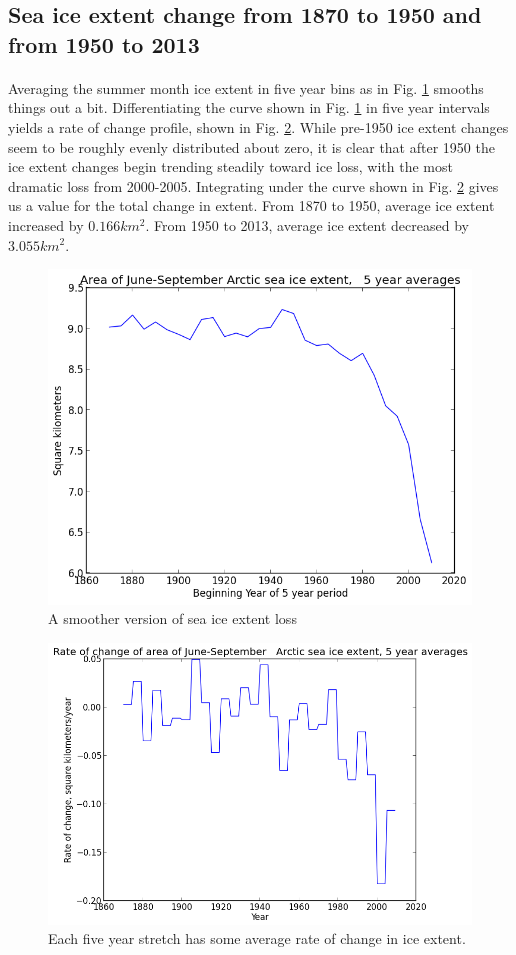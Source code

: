 \documentclass[12pt,a4paper]{article} %
\begin{document}
\subsection{Sea ice extent change from 1870 to 1950 and from 1950 to 2013}
\paragraph{}
Averaging the summer month ice extent in five year bins as in Fig. \ref{avg_area_five_year} smooths things out a bit. Differentiating the curve shown in Fig. \ref{avg_area_five_year} in five year intervals yields a rate of change profile, shown in Fig. \ref{slope}. While pre-1950 ice extent changes seem to be roughly evenly distributed about zero, it is clear that after 1950 the ice extent changes begin trending steadily toward ice loss, with the most dramatic loss from 2000-2005. Integrating under the curve shown in Fig. \ref{slope} gives us a value for the total change in extent.
From 1870 to 1950, average ice extent increased by $0.166 km^{2}$. From 1950 to 2013, average ice extent decreased by $3.055 km^{2}$. 

\begin{figure}[hbp]
\centering
 \includegraphics[width=0.75\linewidth]{../output/avg_area_five_year.png}
\caption{A smoother version of sea ice extent loss}
\label{avg_area_five_year}
\end{figure}

\begin{figure}[hbp]
\centering
 \includegraphics[width=0.75\linewidth]{../output/slope.png}
\caption{Each five year stretch has some average rate of change in ice extent.}
\label{slope}
\end{figure}
\end{document}
